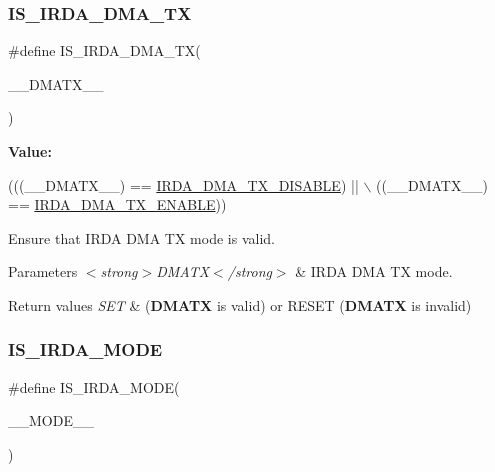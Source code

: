 \subsubsection{\texorpdfstring{I\+S\+\_\+\+I\+R\+D\+A\+\_\+\+D\+M\+A\+\_\+\+TX}{IS\_IRDA\_DMA\_TX}}
{\footnotesize\ttfamily \#define I\+S\+\_\+\+I\+R\+D\+A\+\_\+\+D\+M\+A\+\_\+\+TX(\begin{DoxyParamCaption}\item[{}]{\+\_\+\+\_\+\+D\+M\+A\+T\+X\+\_\+\+\_\+ }\end{DoxyParamCaption})}

{\bfseries Value\+:}
\begin{DoxyCode}
(((\_\_DMATX\_\_) == \hyperlink{group___i_r_d_a___d_m_a___tx_ga9e023ad9d465b2ff0c75fe515e8a65f7}{IRDA\_DMA\_TX\_DISABLE}) || \(\backslash\)
                                       ((\_\_DMATX\_\_) == \hyperlink{group___i_r_d_a___d_m_a___tx_ga4e8223148a583093a0af5c2e60e75270}{IRDA\_DMA\_TX\_ENABLE}))
\end{DoxyCode}


Ensure that I\+R\+DA D\+MA TX mode is valid. 


\begin{DoxyParams}{Parameters}
{\em $<$strong$>$\+D\+M\+A\+T\+X$<$/strong$>$} & I\+R\+DA D\+MA TX mode. \\
\hline
\end{DoxyParams}

\begin{DoxyRetVals}{Return values}
{\em S\+ET} & ({\bfseries D\+M\+A\+TX} is valid) or R\+E\+S\+ET ({\bfseries D\+M\+A\+TX} is invalid) \\
\hline
\end{DoxyRetVals}
\mbox{\label{group___i_r_d_a___private___macros_ga9e804e8a642eb9866ced93b6a47cc9cd}} 
\subsubsection{\texorpdfstring{I\+S\+\_\+\+I\+R\+D\+A\+\_\+\+M\+O\+DE}{IS\_IRDA\_MODE}}
{\footnotesize\ttfamily \#define I\+S\+\_\+\+I\+R\+D\+A\+\_\+\+M\+O\+DE(\begin{DoxyParamCaption}\item[{}]{\+\_\+\+\_\+\+M\+O\+D\+E\+\_\+\+\_\+ }\end{DoxyParamCaption})}

